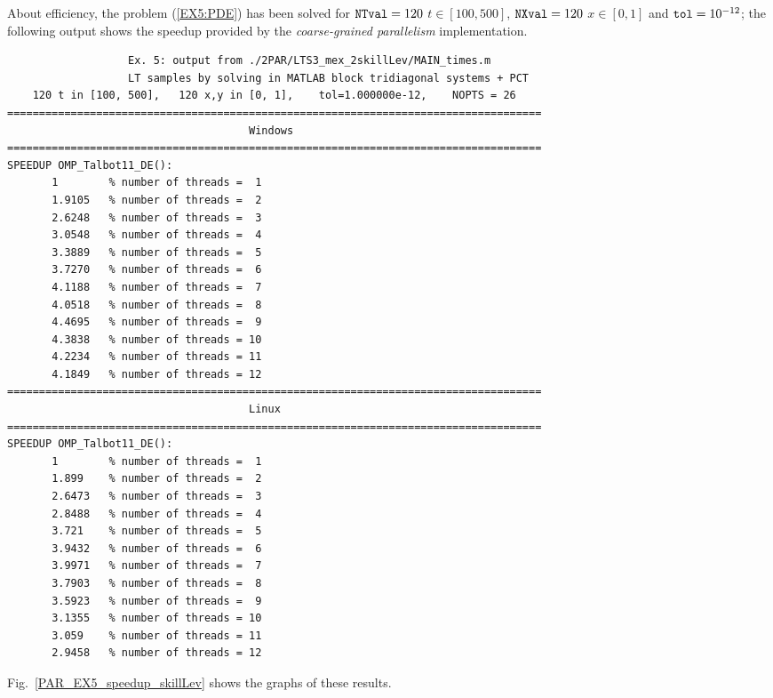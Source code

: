 \documentclass[a4paper,10pt]{report}%
\begin{document}
About efficiency, the problem (\ref{EX5:PDE}) has been solved for ${\tt NTval}=120$ $t\in[100, 500]$,
${\tt NXval}=120$ $x\in[0,1]$ and ${\tt tol}=10^{-12}$; the following output shows the speedup provided by the {\em coarse-grained parallelism} implementation.
\begin{lstlisting}
                   Ex. 5: output from ./2PAR/LTS3_mex_2skillLev/MAIN_times.m
                   LT samples by solving in MATLAB block tridiagonal systems + PCT
    120 t in [100, 500],   120 x,y in [0, 1],    tol=1.000000e-12,    NOPTS = 26
====================================================================================
                                      Windows
====================================================================================
SPEEDUP OMP_Talbot11_DE():
       1        % number of threads =  1
       1.9105   % number of threads =  2
       2.6248   % number of threads =  3
       3.0548   % number of threads =  4
       3.3889   % number of threads =  5
       3.7270   % number of threads =  6
       4.1188   % number of threads =  7
       4.0518   % number of threads =  8
       4.4695   % number of threads =  9
       4.3838   % number of threads = 10
       4.2234   % number of threads = 11
       4.1849   % number of threads = 12
====================================================================================
                                      Linux
====================================================================================
SPEEDUP OMP_Talbot11_DE():
       1        % number of threads =  1
       1.899    % number of threads =  2
       2.6473   % number of threads =  3
       2.8488   % number of threads =  4
       3.721    % number of threads =  5
       3.9432   % number of threads =  6
       3.9971   % number of threads =  7
       3.7903   % number of threads =  8
       3.5923   % number of threads =  9
       3.1355   % number of threads = 10
       3.059    % number of threads = 11
       2.9458   % number of threads = 12
\end{lstlisting}
Fig.~\ref{PAR_EX5_speedup_skillLev} shows the graphs of these results.
\end{document}
